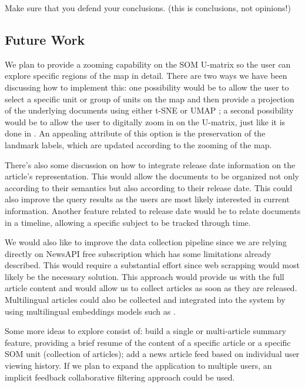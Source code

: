 \documentclass[a4paper]{article}
\begin{document}
Make sure that you defend your conclusions. (this is conclusions, not opinions!)

\subsection{Future Work}

We plan to provide a zooming capability on the SOM U-matrix so the user can explore specific regions of the map in detail. There are two ways we have been discussing how to implement this: one possibility would be to allow the user to select a specific unit or group of units on the map and then provide a projection of the underlying documents using either t-SNE \citep{vandermaaten2008} or UMAP \citep{mcinnes2020}; a second possibility would be to allow the user to digitally zoom in on the U-matrix, just like it is done in \citet{kaski1998}. An appealing attribute of this option is the preservation of the landmark labels, which are updated according to the zooming of the map.

There's also some discussion on how to integrate release date information on the article's representation. This would allow the documents to be organized not only according to their semantics but also according to their release date. This could also improve the query results as the users are most likely interested in current information. Another feature related to release date would be to relate documents in a timeline, allowing a specific subject to be tracked through time. 

We would also like to improve the data collection pipeline since we are relying directly on NewsAPI free subscription which has some limitations already described. This would require a substantial effort since web scrapping would most likely be the necessary solution. This approach would provide us with the full article content and would allow us to collect articles as soon as they are released. Multilingual articles could also be collected and integrated into the system by using multilingual embeddings models such as \citet{conneau2019}.

Some more ideas to explore consist of: build a single or multi-article summary feature, providing a brief resume of the content of a specific article or a specific SOM unit (collection of articles); add a news article feed based on individual user viewing history. If we plan to expand the application to multiple users, an implicit feedback collaborative filtering \citep{hu2008} approach could be used.



\end{document}
